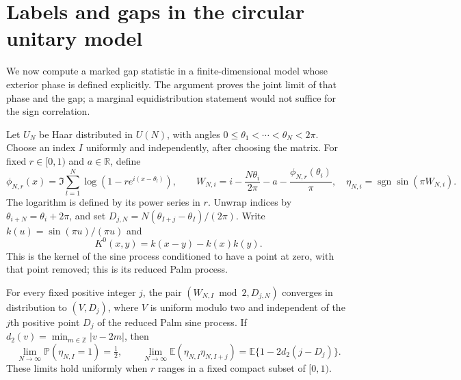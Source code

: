 \section{Labels and gaps in the circular unitary model}
\label{sec:cue-labels}
We now compute a marked gap statistic in a finite-dimensional model whose
exterior phase is defined explicitly. The argument proves the joint limit
of that phase and the gap; a marginal equidistribution statement would
not suffice for the sign correlation.

Let $U_N$ be Haar distributed in $U(N)$, with angles
$0\le\theta_1<\cdots<\theta_N<2\pi$. Choose an index $I$ uniformly
and independently, after choosing the matrix. For fixed $r\in[0,1)$
and $a\in\mathbb R$, define
\[
 \phi_{N,r}(x)=\Im\sum_{l=1}^N\log(1-r e^{i(x-\theta_l)}),\qquad
 W_{N,i}=i-\frac{N\theta_i}{2\pi}-a-
                   \frac{\phi_{N,r}(\theta_i)}\pi,
 \quad \eta_{N,i}=\operatorname{sgn}\sin(\pi W_{N,i}).
\]
The logarithm is defined by its power series in $r$. Unwrap indices by
$\theta_{i+N}=\theta_i+2\pi$, and set
$D_{j,N}=N(\theta_{I+j}-\theta_I)/(2\pi)$.
Write $k(u)=\sin(\pi u)/(\pi u)$ and
\[
 K^0(x,y)=k(x-y)-k(x)k(y).
\]
This is the kernel of the sine process conditioned to have a point at
zero, with that point removed; this is its reduced Palm process.

\begin{theorem}\label{thm:cue-labels}
For every fixed positive integer $j$, the pair
$(W_{N,I}\bmod2,D_{j,N})$ converges in distribution to $(V,D_j)$,
where $V$ is uniform modulo two and independent of the $j$th positive
point $D_j$ of the reduced Palm sine process. If
$d_2(v)=\min_{m\in\mathbb Z}|v-2m|$, then
\[
 \lim_{N\to\infty}\mathbb P(\eta_{N,I}=1)=\tfrac12,
 \qquad
 \lim_{N\to\infty}\mathbb E(\eta_{N,I}\eta_{N,I+j})
       =\mathbb E\{1-2d_2(j-D_j)\}.
\]
These limits hold uniformly when $r$ ranges in a fixed compact subset
of $[0,1)$.
\end{theorem}

